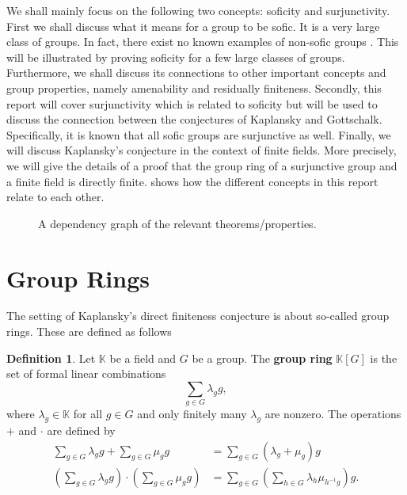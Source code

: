 \documentclass[titlepage, a4paper]{article}
\newcommand{\F}{\mathbb{F}}
\theoremstyle{definition}
\newtheorem{definition}[theorem]{Definition}
\theoremstyle{remark}
\begin{document}
We shall mainly focus on the following two concepts: soficity and surjunctivity. First we shall discuss what it means for a group to be sofic. It is a very large class of groups. In fact, there exist no known examples of non-sofic groups \cite[introduction]{weiss_2000}. This will be illustrated by proving soficity for a few large classes of groups. Furthermore, we shall discuss its connections to other important concepts and group properties, namely amenability and residually finiteness. Secondly, this report will cover surjunctivity which is related to soficity but will be used to discuss the connection between the conjectures of Kaplansky and Gottschalk. Specifically, it is known that all sofic groups are surjunctive as well.
Finally, we will discuss Kaplansky's conjecture in the context of finite fields. More precisely, we will give the details of a proof that the group ring of a surjunctive group and a finite field is directly finite.  shows how the different concepts in this report relate to each other.


\begin{figure}[h]
	\centering
{}
\caption{A dependency graph of the relevant theorems/properties. }
\label{fig:dependency_graph}
\end{figure}
\section{Group Rings}\label{sec:group_rings} 

The setting of Kaplansky's direct finiteness conjecture is about so-called group rings. These are defined as follows


\begin{definition}\label{def:group_ring}
	Let $\mathbb K$ be a field and $G$ be a group. The \textbf{group ring} $\mathbb K[G]$ is the set of formal linear combinations
    \[
        \sum_{g \in G} \lambda_g g,
    \]
    where $\lambda_g \in \mathbb K$ for all $g \in G$ and only finitely many $\lambda_g$ are nonzero. The operations $+$ and $\cdot$ are defined by
    \begin{align*}
        \sum_{g \in G} \lambda_g g + \sum_{g \in G} \mu_g g
        &= \sum_{g \in G} (\lambda_g+\mu_g) g \\
        \left(\sum_{g \in G} \lambda_g g \right) \cdot \left(\sum_{g \in G} \mu_g g \right)
        &= \sum_{g \in G} \left( \sum_{h \in G} \lambda_{h} \mu_{h^{-1}g} \right) g.
    \end{align*}
\end{definition}
\end{document}
